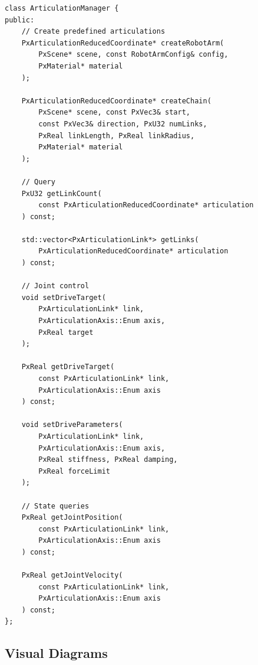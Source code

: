 \begin{lstlisting}[caption={ArticulationManager API}]
class ArticulationManager {
public:
    // Create predefined articulations
    PxArticulationReducedCoordinate* createRobotArm(
        PxScene* scene, const RobotArmConfig& config,
        PxMaterial* material
    );

    PxArticulationReducedCoordinate* createChain(
        PxScene* scene, const PxVec3& start,
        const PxVec3& direction, PxU32 numLinks,
        PxReal linkLength, PxReal linkRadius,
        PxMaterial* material
    );

    // Query
    PxU32 getLinkCount(
        const PxArticulationReducedCoordinate* articulation
    ) const;

    std::vector<PxArticulationLink*> getLinks(
        PxArticulationReducedCoordinate* articulation
    ) const;

    // Joint control
    void setDriveTarget(
        PxArticulationLink* link,
        PxArticulationAxis::Enum axis,
        PxReal target
    );

    PxReal getDriveTarget(
        const PxArticulationLink* link,
        PxArticulationAxis::Enum axis
    ) const;

    void setDriveParameters(
        PxArticulationLink* link,
        PxArticulationAxis::Enum axis,
        PxReal stiffness, PxReal damping,
        PxReal forceLimit
    );

    // State queries
    PxReal getJointPosition(
        const PxArticulationLink* link,
        PxArticulationAxis::Enum axis
    ) const;

    PxReal getJointVelocity(
        const PxArticulationLink* link,
        PxArticulationAxis::Enum axis
    ) const;
};
\end{lstlisting}


\subsection{Visual Diagrams}

